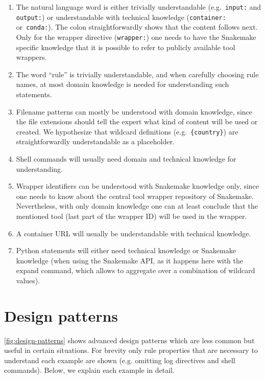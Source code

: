 \documentclass{scrartcl}
\begin{document}
\begin{enumerate}
	\item The natural language word is either trivially understandable (e.g.\ \lstinline!input:! and \lstinline!output:!) or understandable with technical knowledge (\lstinline!container:! or~\lstinline!conda:!).
	      The colon straightforwardly shows that the content follows next.
	      Only for the wrapper directive (\lstinline!wrapper:!) one needs to have the Snakemake specific knowledge that it is possible to refer to publicly available tool wrappers.
	\item
	      The word ``rule'' is trivially understandable, and when
	      carefully choosing rule names, at most domain knowledge is needed for
	      understanding such statements.
	\item
	      Filename patterns can mostly be understood with domain knowledge,
	      since the file extensions should tell the expert what kind of content
	      will be used or created.
	      We hypothesize that wildcard definitions (e.g.~\lstinline!{country}!) are straightforwardly understandable as a placeholder.
	\item
	      Shell commands will usually need domain and technical knowledge for
	      understanding.
	\item
	      Wrapper identifiers can be understood with Snakemake knowledge only,
	      since one needs to know about the central tool wrapper repository of
	      Snakemake.
	      Nevertheless, with only domain knowledge one can at least conclude that the mentioned tool (last part of the wrapper ID) will be used in the wrapper.
	\item
	      A container URL will usually be understandable with technical
	      knowledge.
	\item
	      Python statements will either need technical knowledge or Snakemake
	      knowledge (when using the Snakemake API, as it happens here with the
	      expand command, which allows to aggregate over a combination of
	      wildcard values).
\end{enumerate}



\section{Design patterns}
\label{sec:design-patterns}

\autoref{fig:design-patterns} shows advanced design patterns which are less common but useful in certain situations.
For brevity only rule properties that are necessary to understand each example are shown (e.g. omitting log directives and shell commands).
Below, we explain each example in detail.
\end{document}
